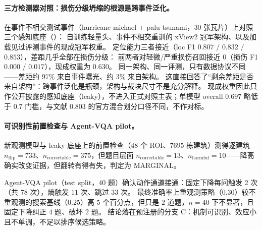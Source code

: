 \paragraph{三方检测器对照：损伤分级坍缩的根源是跨事件泛化。}
在事件不相交测试事件（hurricane-michael + palu-tsunami，$30$ 张瓦片）上对照三个感知底座（）：
自训练轻量头、事件不相交重训的 xView2 冠军架构、以及加载见过评测事件的现成冠军权重。
定位能力三者接近（loc F1 $0.807$ / $0.832$ / $0.853$），差距几乎全部在损伤分级：
前两者对轻微/严重损伤召回接近 $0$（损伤 F1 $0.000$ / $0.017$），现成权重为 $0.630$。
同一架构、同一评测，只有数据协议不同——差距约 $97\%$ 来自事件曝光、约 $3\%$ 来自架构。
这直接回答了``剩余差距是否来自架构''：跨事件泛化是瓶颈，架构与裁块尺寸不是充分解释。
现成权重因此只作公开披露的感知底座（leaky），不进入正式对照主表；单模型 overall $0.697$ 略低于 $0.7$ 门槛，与文献 $0.803$ 的官方混合划分口径不同，不作对标。


\begin{table}[htbp]
\centering
\small
\setlength{\tabcolsep}{4pt}
\caption{检测器离线对照（测试事件 $30$ 张瓦片）。
标记 $^\dagger$ 的两列必须读作 \texttt{leaky} 诊断上界，不得进入正式对照主表，也不得与自训练基线的差值单独归因于架构。
damage F1 为四类调和平均。}
\label{tab:detbe}
\resizebox{\linewidth}{!}{}
\end{table}

\paragraph{可识别性前置检查与 Agent-VQA pilot。}
新观测模型与 leaky 底座上的前置检查（$48$ 个 ROI、$7695$ 栋建筑）测得逐建筑 $n_{\mathrm{flip}}=733$、$n_{\mathrm{correctable}}=375$，但题目层面 $n_{\mathrm{correctable}}=13$、$n_{\mathrm{harmful}}=10$——降高确实改变证据，但翻转有得有失，判定为 MARGINAL。

Agent-VQA pilot（test split，$40$ 题）确认动作通道接通：固定下降每问触发 2 次（共 $78$ 次），熵触发 $11$ 次、跳过 $33$ 次。
最终准确率上重观测策略（$0.30$）较不重观测的搜索基线（$0.25$）高 $5$ 个百分点，但只是 $2$ 道题，$n=40$ 下不显著，且固定下降纠正 $4$ 题、破坏 $2$ 题。
结论落在预注册的分支 C：机制可识别、效应小且不单调，不足以排序候选策略。

